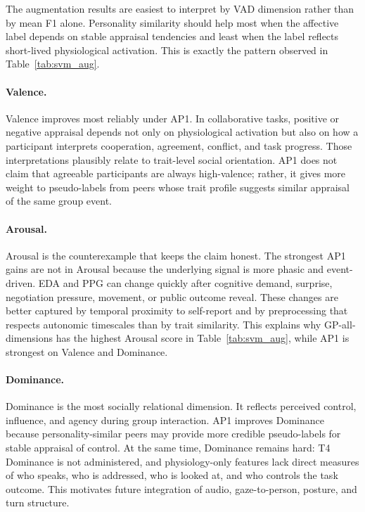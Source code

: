 \documentclass[sigconf,review,anonymous]{acmart}
\begin{document}
The augmentation results are easiest to interpret by VAD dimension rather than
by mean F1 alone.
Personality similarity should help most when the affective label depends on
stable appraisal tendencies and least when the label reflects short-lived
physiological activation.
This is exactly the pattern observed in Table~\ref{tab:svm_aug}.

\paragraph{Valence.}
Valence improves most reliably under AP1.
In collaborative tasks, positive or negative appraisal depends not only on
physiological activation but also on how a participant interprets cooperation,
agreement, conflict, and task progress.
Those interpretations plausibly relate to trait-level social orientation.
AP1 does not claim that agreeable participants are always high-valence; rather,
it gives more weight to pseudo-labels from peers whose trait profile suggests
similar appraisal of the same group event.

\paragraph{Arousal.}
Arousal is the counterexample that keeps the claim honest.
The strongest AP1 gains are not in Arousal because the underlying signal is
more phasic and event-driven.
EDA and PPG can change quickly after cognitive demand, surprise, negotiation
pressure, movement, or public outcome reveal.
These changes are better captured by temporal proximity to self-report and by
preprocessing that respects autonomic timescales than by trait similarity.
This explains why GP-all-dimensions has the highest Arousal score in
Table~\ref{tab:svm_aug}, while AP1 is strongest on Valence and Dominance.

\paragraph{Dominance.}
Dominance is the most socially relational dimension.
It reflects perceived control, influence, and agency during group interaction.
AP1 improves Dominance because personality-similar peers may provide more
credible pseudo-labels for stable appraisal of control.
At the same time, Dominance remains hard: T4 Dominance is not administered,
and physiology-only features lack direct measures of who speaks, who is
addressed, who is looked at, and who controls the task outcome.
This motivates future integration of audio, gaze-to-person, posture, and turn
structure.
\end{document}
